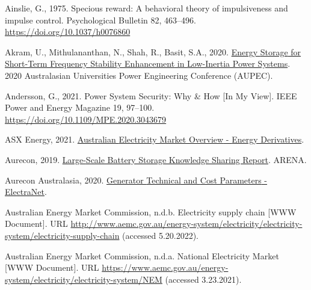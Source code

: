 \documentclass[12pt,a4paper,]{report}
\newlength{\cslhangindent}
\newenvironment{CSLReferences}[2] %
 {%
  \setlength{\parindent}{0pt}
  \ifodd #1 \everypar{\setlength{\hangindent}{\cslhangindent}}\ignorespaces\fi
  \ifnum #2 > 0
  \setlength{\parskip}{#2\baselineskip}
  \fi
 }%
 {}
\begin{document}
\begin{CSLReferences}{1}{0}
\leavevmode{}%
Ainslie, G., 1975. Specious reward: {A} behavioral theory of
impulsiveness and impulse control. Psychological Bulletin 82, 463--496.
\url{https://doi.org/10.1037/h0076860}

\leavevmode{}%
Akram, U., Mithulananthan, N., Shah, R., Basit, S.A., 2020.
\href{https://www.semanticscholar.org/paper/Energy-Storage-for-Short-Term-Frequency-Stability-Akram-Mithulananthan/b74131f080c15125436fe65784135492fa318b02}{Energy
{Storage} for {Short-Term Frequency Stability Enhancement} in
{Low-Inertia Power Systems}}. 2020 Australasian Universities Power
Engineering Conference (AUPEC).

\leavevmode{}%
Andersson, G., 2021. Power {System Security}: {Why} \& {How} {[}{In My
View}{]}. IEEE Power and Energy Magazine 19, 97--100.
\url{https://doi.org/10.1109/MPE.2020.3043679}

\leavevmode{}%
ASX Energy, 2021.
\href{https://www.asxenergy.com.au/products/electricity_futures}{Australian
{Electricity Market Overview} - {Energy Derivatives}}.

\leavevmode{}%
Aurecon, 2019.
\href{https://arena.gov.au/knowledge-bank/large-scale-battery-storage-knowledge-sharing-report/}{Large-{Scale
Battery Storage Knowledge Sharing Report}}. ARENA.

\leavevmode{}%
Aurecon Australasia, 2020.
\href{https://www.electranet.com.au/wp-content/uploads/projects/2016/11/508986-REP-ElectraNet-Generator-Technical-And-Cost-Parameters-23July2020.pdf}{Generator
{Technical} and {Cost Parameters} - {ElectraNet}}.

\leavevmode{}%
Australian Energy Market Commission, n.d.b. Electricity supply chain
{[}WWW Document{]}. URL
\url{http://www.aemc.gov.au/energy-system/electricity/electricity-system/electricity-supply-chain}
(accessed 5.20.2022).

\leavevmode{}%
Australian Energy Market Commission, n.d.a. National {Electricity
Market} {[}WWW Document{]}. URL
\url{https://www.aemc.gov.au/energy-system/electricity/electricity-system/NEM}
(accessed 3.23.2021).


\end{CSLReferences}
\end{document}
